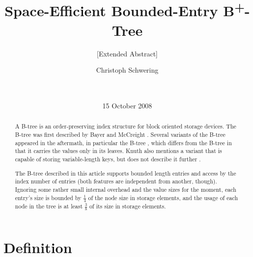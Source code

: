 \documentclass{vldb}
\begin{document}
\title{Space-Efficient Bounded-Entry B\textsuperscript{+}-Tree}
\subtitle{[Extended Abstract]}

\author{
\alignauthor
Christoph Schwering\\
   \\
   \\
}
\date{15 October 2008}


\maketitle

\begin{abstract}
A B-tree is an order-preserving index structure for block oriented storage
devices.
The B-tree was first described by Bayer and McCreight \cite{Bayer}.
Several variants of the B-tree appeared in the aftermath, in particular the
B-tree \cite{Cormen, KnuthBTree}, which differs from the
B-tree in that it carries the values only in its leaves.
Knuth also mentions a variant that is capable of storing variable-length
keys, but does not describe it further \cite{KnuthBTree}.

The B-tree described in this article supports bounded length
entries and access by the index number of entries (both features are independent
from another, though).
Ignoring some rather small internal overhead and the value sizes for the 
moment, each entry's size is bounded by $\tfrac{1}{4}$ of the node size
in storage elements, and the usage of each node in the tree is at least
$\tfrac{3}{8}$ of its size in storage elements.
\end{abstract}



\section{Definition} %
\end{document}
